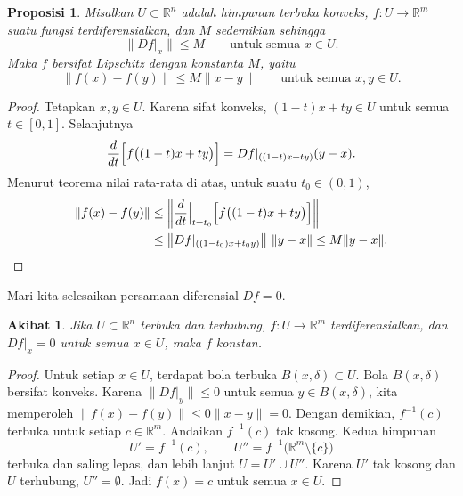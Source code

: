 \documentclass[12pt,openany]{book}
\newcommand{\snorm}[1]{\lVert {#1} \rVert}
\newcommand{\norm}[1]{\left\lVert {#1} \right\rVert}
\newcommand{\R}{{\mathbb{R}}}
\theoremstyle{plain}
\newtheorem{prop}[thm]{Proposisi}
\newtheorem{cor}[thm]{Akibat}
\theoremstyle{remark}
\theoremstyle{definition}
\theoremstyle{exercise}
\theoremstyle{example}
\begin{document}
\begin{prop} \label{mv:prop:convexlip}
Misalkan $U \subset \R^n$ adalah himpunan terbuka konveks, $f \colon U \to \R^m$
suatu fungsi terdiferensialkan, dan $M$ sedemikian sehingga
\begin{equation*}
\snorm{Df|_x} \leq M
\qquad \text{untuk semua } x \in U.
\end{equation*}
Maka $f$ bersifat Lipschitz dengan konstanta $M$, yaitu
\begin{equation*}
\snorm{f(x)-f(y)} \leq M \snorm{x-y}
\qquad
\text{untuk semua } x,y \in U.
\end{equation*}
\end{prop}

\begin{proof}
Tetapkan $x,y \in U$.  Karena sifat konveks,
$(1-t)x+ty \in U$ untuk semua $t \in [0,1]$.
Selanjutnya
\begin{equation*}
\frac{d}{dt} \Bigl[f\bigl((1-t)x+ty\bigr)\Bigr]
=
Df|_{((1-t)x+ty)} (y-x) .
\end{equation*}
Menurut teorema nilai rata-rata di atas, untuk
suatu $t_0 \in (0,1)$,
\begin{equation*}
\begin{split}
\snorm{f(x)-f(y)} & \leq
\norm{\frac{d}{dt} \Big|_{t=t_0} \Bigl[ f\bigl((1-t)x+ty\bigr) \Bigr] }
\\
& \leq
\norm{Df|_{((1-t_0)x+t_0y)}} \, \snorm{y-x} \leq
M \snorm{y-x} . \qedhere
\end{split}
\end{equation*}
\end{proof}

Mari kita selesaikan persamaan diferensial $Df = 0$.

\begin{cor} \label{thm:svzerodersol}
Jika $U \subset \R^n$ terbuka dan terhubung, $f \colon U \to \R^m$ terdiferensialkan,
dan $Df|_x = 0$ untuk semua $x \in U$, maka $f$ konstan.
\end{cor}

\begin{proof}
Untuk setiap $x \in U$, terdapat bola terbuka $B(x,\delta) \subset U$.  Bola
$B(x,\delta)$ bersifat konveks.  Karena
$\snorm{Df|_y} \leq 0$ untuk semua $y \in B(x,\delta)$, kita memperoleh
$\snorm{f(x)-f(y)} \leq 0 \snorm{x-y} = 0$.
Dengan demikian, $f^{-1}(c)$ terbuka untuk setiap $c \in \R^m$.  Andaikan
$f^{-1}(c)$ tak kosong.
Kedua himpunan
\begin{equation*}
U' = f^{-1}(c), \qquad U'' = f^{-1}\bigl(\R^m\setminus\{c\}\bigr)
\end{equation*}
terbuka dan saling lepas, dan lebih lanjut $U = U' \cup U''$.  Karena $U'$ tak kosong
dan $U$ terhubung, $U'' = \emptyset$.  Jadi $f(x) = c$ untuk semua $x \in U$.
\end{proof}
\end{document}
